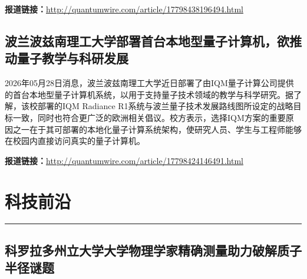 \documentclass[12pt,a4paper]{ctexart}
\begin{document}
\noindent\textbf{报道链接：}\url{http://quantumwire.com/article/17798438196494.html}

\subsection{ 波兰波兹南理工大学部署首台本地型量子计算机，欲推动量子教学与科研发展 }

2026年05月28日消息，波兰波兹南理工大学近日部署了由IQM量子计算公司提供的首台本地型量子计算机系统，以用于支持量子技术领域的教学与科学研究。据了解，该校部署的IQM Radiance R1系统与波兰量子技术发展路线图所设定的战略目标一致，同时也符合更广泛的欧洲相关倡议。校方表示，选择IQM方案的重要原因之一在于其可部署的本地化量子计算系统架构，使研究人员、学生与工程师能够在校园内直接访问真实的量子计算机。

\noindent\textbf{报道链接：}\url{http://quantumwire.com/article/17798424146491.html}


\newpage
\section{科技前沿}
\vspace{-0.5em}
\noindent\rule{\linewidth}{1.5pt}

\subsection{ 科罗拉多州立大学大学物理学家精确测量助力破解质子半径谜题 }
\end{document}
